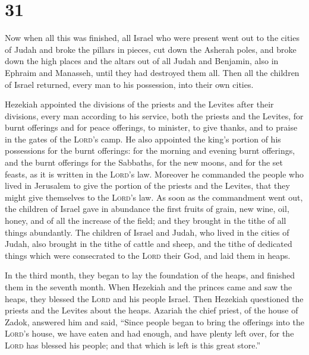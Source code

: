 \hypertarget{section-30}{%
\section{31}\label{section-30}}

 Now when all this was finished, all Israel who were
present went out to the cities of Judah and broke the pillars in pieces,
cut down the Asherah poles, and broke down the high places and the
altars out of all Judah and Benjamin, also in Ephraim and Manasseh,
until they had destroyed them all. Then all the children of Israel
returned, every man to his possession, into their own cities.

 Hezekiah appointed the divisions of the priests and the
Levites after their divisions, every man according to his service, both
the priests and the Levites, for burnt offerings and for peace
offerings, to minister, to give thanks, and to praise in the gates of
the \textsc{Lord}'s camp.  He also appointed the king's
portion of his possessions for the burnt offerings: for the morning and
evening burnt offerings, and the burnt offerings for the Sabbaths, for
the new moons, and for the set feasts, as it is written in the
\textsc{Lord}'s law.  Moreover he commanded the people who
lived in Jerusalem to give the portion of the priests and the Levites,
that they might give themselves to the \textsc{Lord}'s law.
 As soon as the commandment went out, the children of
Israel gave in abundance the first fruits of grain, new wine, oil,
honey, and of all the increase of the field; and they brought in the
tithe of all things abundantly.  The children of Israel
and Judah, who lived in the cities of Judah, also brought in the tithe
of cattle and sheep, and the tithe of dedicated things which were
consecrated to the \textsc{Lord} their God, and laid them in heaps.

 In the third month, they began to lay the foundation of
the heaps, and finished them in the seventh month.  When
Hezekiah and the princes came and saw the heaps, they blessed the
\textsc{Lord} and his people Israel.  Then Hezekiah
questioned the priests and the Levites about the heaps. 
Azariah the chief priest, of the house of Zadok, answered him and said,
``Since people began to bring the offerings into the \textsc{Lord}'s
house, we have eaten and had enough, and have plenty left over, for the
\textsc{Lord} has blessed his people; and that which is left is this
great store.''


